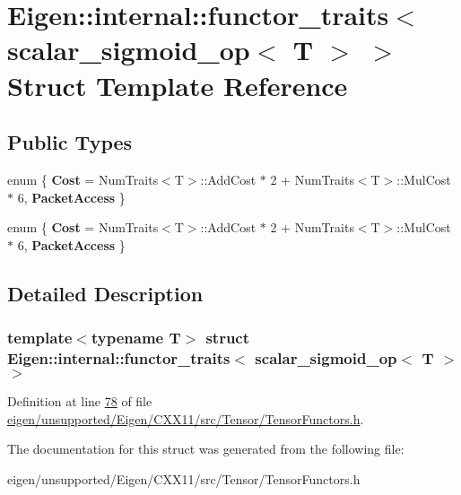 \hypertarget{struct_eigen_1_1internal_1_1functor__traits_3_01scalar__sigmoid__op_3_01_t_01_4_01_4}{}\section{Eigen\+:\+:internal\+:\+:functor\+\_\+traits$<$ scalar\+\_\+sigmoid\+\_\+op$<$ T $>$ $>$ Struct Template Reference}
\label{struct_eigen_1_1internal_1_1functor__traits_3_01scalar__sigmoid__op_3_01_t_01_4_01_4}
\subsection*{Public Types}
\begin{DoxyCompactItemize}
\item 
\mbox{\label{struct_eigen_1_1internal_1_1functor__traits_3_01scalar__sigmoid__op_3_01_t_01_4_01_4_a0c829942b216db531b652619cad942fd}} 
enum \{ {\bfseries Cost} = Num\+Traits$<$T$>$\+:\+:Add\+Cost $\ast$ 2 + Num\+Traits$<$T$>$\+:\+:Mul\+Cost $\ast$ 6, 
{\bfseries Packet\+Access}
 \}
\item 
\mbox{\label{struct_eigen_1_1internal_1_1functor__traits_3_01scalar__sigmoid__op_3_01_t_01_4_01_4_a217f162156392f93d1606ac857204a2e}} 
enum \{ {\bfseries Cost} = Num\+Traits$<$T$>$\+:\+:Add\+Cost $\ast$ 2 + Num\+Traits$<$T$>$\+:\+:Mul\+Cost $\ast$ 6, 
{\bfseries Packet\+Access}
 \}
\end{DoxyCompactItemize}


\subsection{Detailed Description}
\subsubsection*{template$<$typename T$>$\newline
struct Eigen\+::internal\+::functor\+\_\+traits$<$ scalar\+\_\+sigmoid\+\_\+op$<$ T $>$ $>$}



Definition at line \hyperlink{eigen_2unsupported_2_eigen_2_c_x_x11_2src_2_tensor_2_tensor_functors_8h_source_l00078}{78} of file \hyperlink{eigen_2unsupported_2_eigen_2_c_x_x11_2src_2_tensor_2_tensor_functors_8h_source}{eigen/unsupported/\+Eigen/\+C\+X\+X11/src/\+Tensor/\+Tensor\+Functors.\+h}.



The documentation for this struct was generated from the following file\+:\begin{DoxyCompactItemize}
\item 
eigen/unsupported/\+Eigen/\+C\+X\+X11/src/\+Tensor/\+Tensor\+Functors.\+h\end{DoxyCompactItemize}
